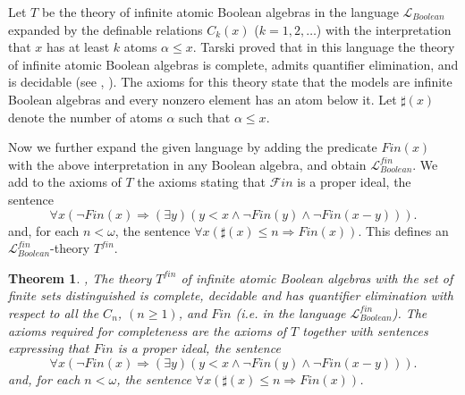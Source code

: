 \documentclass[12pt]{amsart}
\def\B{\mathbb{B}}
\def\cL{\mathcal{L}}
\def\cL{\mathcal{L}}
\newtheorem{thm}{Theorem}[section]
\numberwithin{equation}{section}
\begin{document}
Let $T$ be the theory of infinite atomic Boolean algebras in the language 
$\mathcal{L}_{Boolean}$ expanded by the definable relations $C_k(x)$ ($k=1,2,\dots$) 
with the interpretation that $x$ has at least $k$ atoms $\alpha \leq x$. Tarski proved that in this language the 
theory of infinite atomic Boolean algebras is complete, admits quantifier elimination, and is decidable (see \cite{FV}, \cite{DM-bool}). The axioms for this theory state that the models are infinite Boolean algebras and every nonzero element has an atom below it. Let $\sharp(x)$ denote the number of atoms $\alpha$ such that $\alpha \leq x$. 

Now we further expand the given language by adding the predicate $Fin(x)$ with the above interpretation in any Boolean algebra, and obtain $\cL_{Boolean}^{fin}$. We add to the axioms of $T$ the axioms stating that $\mathcal{F}in$ is a proper ideal, the sentence
$$
\forall x (\neg Fin(x) \Rightarrow (\exists y)(y<x \wedge \neg Fin(y) \wedge \neg Fin(x-y))).
$$
and, for each $n<\omega$, the sentence $\forall x (\sharp(x)\leq n \Rightarrow Fin(x))$.
This defines an $\cL_{Boolean}^{fin}$-theory $T^{fin}$.

\begin{thm}\label{bool1}\cite{FV},\cite{DM-bool} The theory $T^{fin}$ of infinite atomic Boolean algebras with the 
set of finite sets distinguished is complete, decidable and 
has quantifier elimination with respect to all the $C_n$, $(n\geq 1)$, and $Fin$ (i.e. in the language 
$\mathcal{L}_{Boolean}^{fin}$). The axioms required for completeness are the 
axioms of $T$ together with 
sentences expressing that $Fin$ is a proper ideal, the sentence
$$
\forall x (\neg Fin(x) \Rightarrow (\exists y)(y<x \wedge \neg Fin(y) \wedge \neg Fin(x-y))).
$$
and, for each $n<\omega$, the sentence $\forall x (\sharp(x)\leq n \Rightarrow Fin(x))$.
\end{thm}

\end{document}
